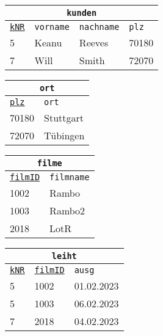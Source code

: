 \begin{minipage}{\textwidth}
	\begin{minipage}{0.4\textwidth}
		\begin{tabular}{llll}
			\multicolumn{4}{c}{\lstinline!kunden!}\\
			\hline
			\underline{\lstinline!kNR!}&\lstinline!vorname!&\lstinline!nachname!&\lstinline!plz!\\
			\hline
			5&Keanu&Reeves&70180\\
			7&Will&Smith&72070\\
		\end{tabular}
	\end{minipage}
	\begin{minipage}{0.25\textwidth}
		\begin{tabular}{ll}
			\multicolumn{2}{c}{\lstinline!ort!}\\
			\hline
			\underline{\lstinline!plz!}&\lstinline!ort!\\
			\hline
			70180&Stuttgart\\
			72070&Tübingen\\
		\end{tabular}
	\end{minipage}
\end{minipage}
\begin{minipage}{0.4\textwidth}
	\begin{tabular}{ll}
		\multicolumn{2}{c}{\lstinline!filme!}\\
		\hline
		\underline{\lstinline!filmID!}&\lstinline!filmname!\\
		\hline
		1002&Rambo\\
		1003&Rambo2\\
		2018&LotR\\
	\end{tabular}
\end{minipage}
		\begin{minipage}{0.3\textwidth}
	\begin{tabular}{lll}
		\multicolumn{3}{c}{\lstinline!leiht!}\\
		\hline
		\underline{\lstinline!kNR!}&\underline{\lstinline!filmID!}&\lstinline!ausg!\\
		\hline
		5&1002&01.02.2023\\
		5&1003&06.02.2023\\
		7&2018&04.02.2023\\
	\end{tabular}
\end{minipage}

